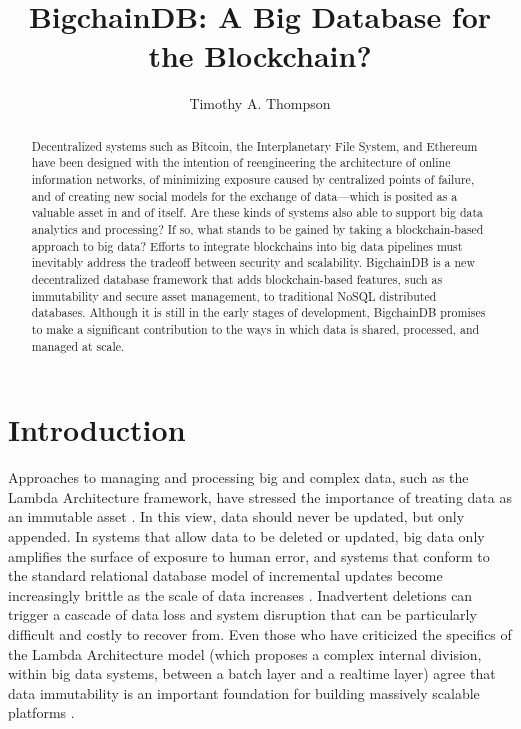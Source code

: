 \documentclass[sigconf]{acmart}
\begin{document}
\title{BigchainDB: A Big Database for the Blockchain?}
\author{Timothy A. Thompson}

\begin{abstract} 
Decentralized systems such as Bitcoin, the Interplanetary File System, and Ethereum have been designed with the intention of reengineering the architecture of online information networks, of minimizing exposure caused by centralized points of failure, and of creating new social models for the exchange of data---which is posited as a valuable asset in and of itself. Are these kinds of systems also able to support big data analytics and processing? If so, what stands to be gained by taking a blockchain-based approach to big data? Efforts to integrate blockchains into big data pipelines must inevitably address the tradeoff between security and scalability. BigchainDB is a new decentralized database framework that adds blockchain-based features, such as immutability and secure asset management, to traditional NoSQL distributed databases. Although it is still in the early stages of development, BigchainDB promises to make a significant contribution to the ways in which data is shared, processed, and managed at scale.
\end{abstract}


\maketitle

\section{Introduction}
Approaches to managing and processing big and complex data, such as the Lambda Architecture framework, have stressed the importance of treating data as an immutable asset \cite{nM15}. In this view, data should never be updated, but only appended. In systems that allow data to be deleted or updated, big data only amplifies the surface of exposure to human error, and systems that conform to the standard relational database model of incremental updates become increasingly brittle as the scale of data increases \cite{nM15}. Inadvertent deletions can trigger a cascade of data loss and system disruption that can be particularly difficult and costly to recover from. Even those who have criticized the specifics of the Lambda Architecture model (which proposes a complex internal division, within big data systems, between a batch layer and a realtime layer) agree that data immutability is an important foundation for building massively scalable platforms \cite{jK14}.
\end{document}
